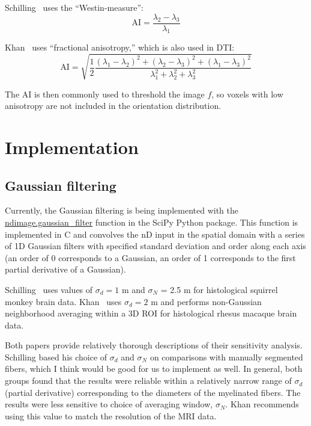 \documentclass[11pt]{article}
\begin{document}
Schilling~\cite{Schilling2016, Schilling2018} uses the ``Westin-measure'':
\begin{equation}
  \label{eq:westin}
  \text{AI} = \frac{\lambda_2 - \lambda_3}{\lambda_1}
\end{equation}

Khan~\cite{Khan2015} uses ``fractional anisotropy,'' which is also used in DTI:
\begin{equation}
  \label{eq:FA}
  \text{AI} = \sqrt{\frac{1}{2}\frac{(\lambda_1-\lambda_2)^2 + (\lambda_2-\lambda_3)^2 +
      (\lambda_1 - \lambda_3)^2}{\lambda_1^2 + \lambda_2^2 + \lambda_3^2}}
\end{equation}

The AI is then commonly used to threshold the image $f$, so voxels with low
anisotropy are not included in the orientation distribution.

\section{Implementation}

\subsection{Gaussian filtering}

Currently, the Gaussian filtering is being implemented with the
\href{https://docs.scipy.org/doc/scipy-0.16.1/reference/generated/scipy.ndimage.filters.gaussian_filter.html}{ndimage.gaussian\_filter}
function in the SciPy Python package. This function is implemented in C and
convolves the nD input in the spatial domain with a series of 1D Gaussian
filters with specified standard deviation and order along each axis (an order of
0 corresponds to a Gaussian, an order of 1 corresponds to the first partial
derivative of a Gaussian).

Schilling~\cite{Schilling2018} uses values of $\sigma_d=1$ \textmu m and
$\sigma_N$ = 2.5 \textmu m for histological squirrel monkey brain data.
Khan~\cite{Khan2015} uses $\sigma_d=2$ \textmu m and performs non-Gaussian
neighborhood averaging within a 3D ROI for histological rhesus macaque brain
data.

Both papers provide relatively thorough descriptions of their sensitivity
analysis. Schilling based his choice of $\sigma_d$ and $\sigma_N$ on comparisons
with manually segmented fibers, which I think would be good for us to implement
as well. In general, both groups found that the results were reliable within a
relatively narrow range of $\sigma_d$ (partial derivative) corresponding to the
diameters of the myelinated fibers. The results were less sensitive to choice of
averaging window, $\sigma_N$. Khan recommends using this value to match the
resolution of the MRI data.
\end{document}

